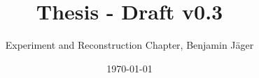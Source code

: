

\endofdump


% 

\newif\ifIMAGES
\IMAGEStrue




\author{Experiment and Reconstruction Chapter, Benjamin Jäger}
\date{\today}
\title{Thesis - Draft v0.3}





\maketitle




\tableofcontents


\newcommand{\chapterdir}{chapters}
%












